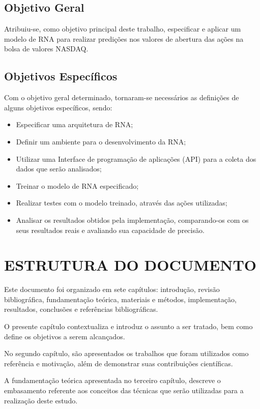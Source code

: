 \subsection{Objetivo Geral} 
Atribuiu-se, como objetivo principal deste trabalho, especificar e aplicar um modelo de RNA para realizar predições nos valores de abertura das ações na bolsa de valores NASDAQ.

\subsection{Objetivos Específicos}\label{subsec:objetivos_especificos}
Com o objetivo geral determinado, tornaram-se necessários as definições de alguns objetivos específicos, sendo:
\begin{itemize}
	\item Especificar uma arquitetura de RNA;
	\item Definir um ambiente para o desenvolvimento da RNA;
	\item Utilizar uma Interface de programação de aplicações (API) para a coleta dos dados que serão analisados;
	\item Treinar o modelo de RNA especificado;
	\item Realizar testes com o modelo treinado, através das ações utilizadas;
	\item Analisar os resultados obtidos pela implementação, comparando-os com os seus resultados reais e avaliando sua capacidade de precisão.
\end{itemize}

\section{ESTRUTURA DO DOCUMENTO}\label{sec:organizacao-trabalho}
Este documento foi organizado em sete capítulos: introdução, revisão bibliográfica, fundamentação teórica, materiais e métodos, implementação, resultados, conclusões e referências bibliográficas.

O presente capítulo contextualiza e introduz o assunto a ser tratado, bem como define os objetivos a serem alcançados.

No segundo capítulo, são apresentados os trabalhos que foram utilizados como referência e motivação, além de demonstrar suas contribuições científicas.

A fundamentação teórica apresentada no terceiro capítulo, descreve o embasamento referente aos conceitos das técnicas que serão utilizadas para a realização deste estudo.

